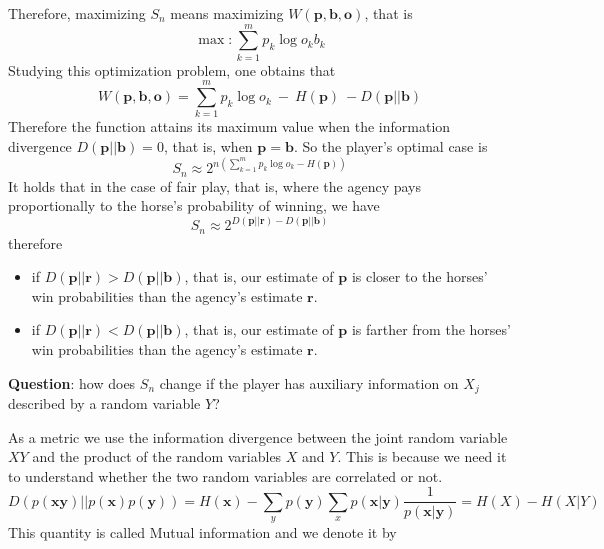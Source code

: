 \documentclass{article}
\begin{document}
Therefore, maximizing $S_n$ means maximizing $W(\mathbf{p}, \mathbf{b}, \mathbf{o})$, that is
\begin{equation}
    \max: \sum_{k=1}^{m}p_k\log o_k b_k
\end{equation}
Studying this optimization problem, one obtains that
\begin{equation}
    W(\mathbf{p}, \mathbf{b}, \mathbf{o}) = \sum_{k=1}^{m}p_k\log o_k\ - \ H(\mathbf{p})\ - D(\mathbf{p}||\mathbf{b})
\end{equation}
Therefore the function attains its maximum value when the information divergence $D(\mathbf{p}||\mathbf{b}) = 0$, that is, when $\mathbf{p} = \mathbf{b}$.
So the player's optimal case is
\begin{equation}
    S_n \approx 2^{n(\sum_{k=1}^{m}p_k \log o_k - H(\mathbf{p}))}
\end{equation}
It holds that in the case of fair play, that is, where the agency pays proportionally to the horse's probability of winning, we have
\begin{equation}
    S_n \approx 2^{D(\mathbf{p}||\mathbf{r}) - D(\mathbf{p}||\mathbf{b})}
\end{equation}
therefore
\begin{itemize}
    \item if $D(\mathbf{p}||\mathbf{r}) > D(\mathbf{p}||\mathbf{b})$, that is, our estimate of $\mathbf{p}$ is closer to the horses' win probabilities than the agency's estimate $\mathbf{r}$.
    \item if $D(\mathbf{p}||\mathbf{r}) < D(\mathbf{p}||\mathbf{b})$, that is, our estimate of $\mathbf{p}$ is farther from the horses' win probabilities than the agency's estimate $\mathbf{r}$.
\end{itemize}
\begin{center}
    \textbf{Question}: how does $S_n$ change if the player has auxiliary information on $X_j$ described by a random variable $Y$?
\end{center}
As a metric we use the information divergence between the joint random variable $XY$ and the product of the random variables $X$ and $Y$. This is because we need it to understand whether the two random variables are correlated or not. 
\begin{equation}
    D(p(\mathbf{xy})||p(\mathbf{x})p(\mathbf{y})) = H(\mathbf{x}) - \sum_{y}p(\mathbf{y})\sum_{x}p(\mathbf{x|\mathbf{y}})\dfrac{1}{p(\mathbf{x}|\mathbf{y})} = H(X) - H(X|Y) 
\end{equation}
This quantity is called Mutual information and we denote it by
\end{document}
